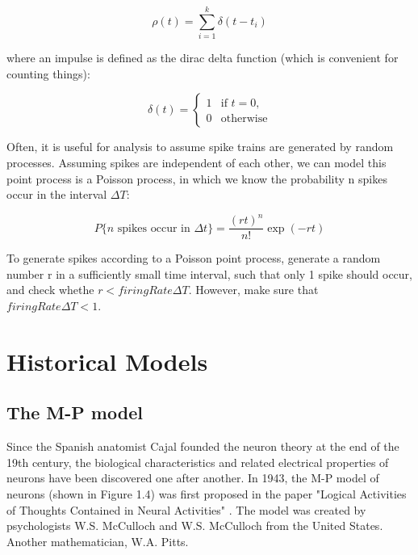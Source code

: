 \documentclass[paper=a4, fontsize=11pt]{scrartcl} %
\numberwithin{equation}{section} %
\numberwithin{figure}{section} %
\numberwithin{table}{section} %
\begin{document}
\begin{equation}
    \rho(t) = \sum_{i=1}^{k} \delta(t-t_i)
\end{equation}

where an impulse is defined as the dirac delta function (which is convenient for counting things):

\begin{equation}
    \delta(t) = \begin{cases} 1 & \text{if } t = 0, \\ 0 & \text{otherwise} \end{cases}
\end{equation}

Often, it is useful for analysis to assume spike trains are generated by random processes. Assuming spikes are independent of each other, we can model this point process is a Poisson process, in which we know the probability n spikes occur in the interval $\Delta T$:

\begin{equation}
    P\{n \text{ spikes occur in } \Delta t\} = \frac{(rt)^n}{n!} \exp(-rt)
\end{equation}

To generate spikes according to a Poisson point process, generate a random number r in a sufficiently small time interval, such that only 1 spike should occur, and check whethe $r < firingRate \Delta T$. However, make sure that $firingRate\Delta T < 1$.






\section{Historical Models}

\subsection{The M-P model}
Since the Spanish anatomist Cajal founded the neuron theory at the end of the 19th century, the biological characteristics and related electrical properties of neurons have been discovered one after another. In 1943, the M-P model of neurons (shown in Figure 1.4) was first proposed in the paper "Logical Activities of Thoughts Contained in Neural Activities" \cite{Mcculloch1854LOGICALCALCULUSIDEAS}. The model was created by psychologists W.S. McCulloch and W.S. McCulloch from the United States. Another mathematician, W.A. Pitts.
\end{document}
